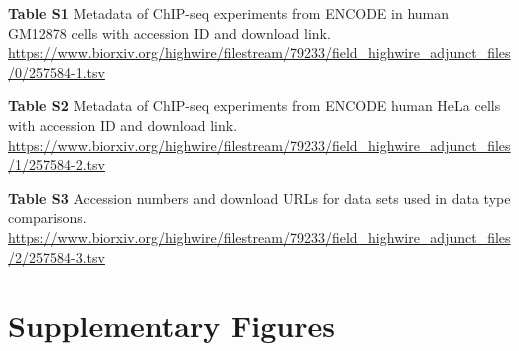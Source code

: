 \documentclass[a4paper,twoside=true,openright,parskip=full,chapterprefix=true,11pt,headings=normal,bibliography=totoc,listof=totoc,titlepage=on,captions=tableabove,draft=false]{scrreprt}
\theoremstyle{definition}
\theoremstyle{definition}
\theoremstyle{definition}
\theoremstyle{remark}
\begin{document}
\textbf{Table S1} Metadata of ChIP-seq experiments from ENCODE in human
GM12878 cells with accession ID and download link.
\url{https://www.biorxiv.org/highwire/filestream/79233/field_highwire_adjunct_files/0/257584-1.tsv}

\textbf{Table S2 } Metadata of ChIP-seq experiments from ENCODE human
HeLa cells with accession ID and download link.
\url{https://www.biorxiv.org/highwire/filestream/79233/field_highwire_adjunct_files/1/257584-2.tsv}

\textbf{Table S3} Accession numbers and download URLs for data sets used
in data type comparisons.
\url{https://www.biorxiv.org/highwire/filestream/79233/field_highwire_adjunct_files/2/257584-3.tsv}

\hypertarget{supplementary-figures-1}{%
\section{Supplementary Figures}\label{supplementary-figures-1}}
\end{document}
